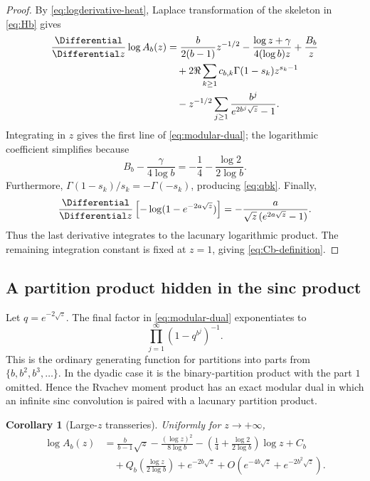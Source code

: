 \documentclass[11pt]{article}
\newtheorem{corollary}[theorem]{Corollary}
\theoremstyle{definition}
\theoremstyle{remark}
\begin{document}
\begin{proof}
By \eqref{eq:logderivative-heat}, Laplace transformation of the skeleton in
\eqref{eq:Hb} gives
\begin{align*}
 \frac{\Differential}{\Differential z}\log A_b(z)
 &=\frac{b}{2(b-1)}z^{-1/2}
 -\frac{\log z+\gamma}{4(\log b)z}
 +\frac{B_b}{z}\\
 &\quad+2\Re\sum_{k\ge1}c_{b,k}\Gamma(1-s_k)z^{s_k-1}\\
 &\quad-z^{-1/2}\sum_{j\ge1}
 \frac{b^j}{e^{2b^j\sqrt z}-1}.
\end{align*}
Integrating in \(z\) gives the first line of \eqref{eq:modular-dual}; the logarithmic coefficient simplifies because
\[
 B_b-\frac{\gamma}{4\log b}
 =-\frac14-\frac{\log2}{2\log b}.
\]
Furthermore,
\(
\Gamma(1-s_k)/s_k=-\Gamma(-s_k)
\), producing \eqref{eq:qbk}.  Finally,
\[
 \frac{\Differential}{\Differential z}
 \left[-\log(1-e^{-2a\sqrt z})\right]
 =-\frac{a}{\sqrt z\,(e^{2a\sqrt z}-1)}.
\]
Thus the last derivative integrates to the lacunary logarithmic product.  The remaining integration constant is fixed at \(z=1\), giving \eqref{eq:Cb-definition}.
\end{proof}

\subsection{A partition product hidden in the sinc product}

Let \(q=e^{-2\sqrt z}\).  The final factor in \eqref{eq:modular-dual} exponentiates to
\begin{equation}\label{eq:lacunary-partition}
  \prod_{j=1}^{\infty}(1-q^{b^j})^{-1}.
\end{equation}
This is the ordinary generating function for partitions into parts from
\(\{b,b^2,b^3,\ldots\}\).  In the dyadic case it is the binary-partition product with the part \(1\) omitted.  Hence the Rvachev moment product has an exact modular dual in which an infinite sinc convolution is paired with a lacunary partition product.

\begin{corollary}[Large-\(z\) transseries]\label{cor:large-z}
Uniformly for \(z\to+\infty\),
\begin{align}
 \log A_b(z)
 &=\frac{b}{b-1}\sqrt z
 -\frac{(\log z)^2}{8\log b}
 -\left(\frac14+\frac{\log2}{2\log b}\right)\log z
 +C_b\\
 &\quad+Q_b\!\left(\frac{\log z}{2\log b}\right)
 +e^{-2b\sqrt z}+O(e^{-4b\sqrt z}+e^{-2b^2\sqrt z}).
 \label{eq:large-z-transseries}
\end{align}
\end{corollary}
\end{document}
